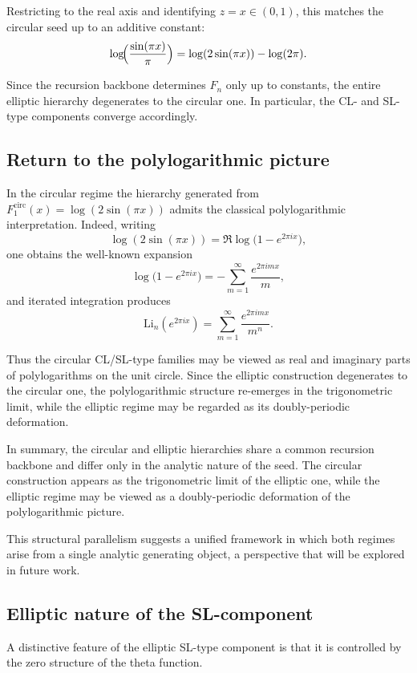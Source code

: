 \documentclass[11pt]{article}
\begin{document}
Restricting to the real axis and identifying $z=x\in(0,1)$,
this matches the circular seed up to an additive constant:
\[
\log\!\Bigl(\frac{\sin(\pi x)}{\pi}\Bigr)
=
\log(2\sin(\pi x))-\log(2\pi).
\]

Since the recursion backbone determines $F_n$ only up to constants,
the entire elliptic hierarchy degenerates to the circular one.
In particular, the CL- and SL-type components converge accordingly.


\subsection{Return to the polylogarithmic picture}

In the circular regime the hierarchy generated from
\(
F^{\mathrm{circ}}_1(x)=\log(2\sin(\pi x))
\)
admits the classical polylogarithmic interpretation.
Indeed, writing
\[
\log(2\sin(\pi x))
=
\Re \log\!\bigl(1-e^{2\pi i x}\bigr),
\]
one obtains the well-known expansion
\[
\log\!\bigl(1-e^{2\pi i x}\bigr)
=
-\sum_{m=1}^{\infty}\frac{e^{2\pi i m x}}{m},
\]
and iterated integration produces~\cite{ZagierPolylog}
\[
\mathrm{Li}_n(e^{2\pi i x})
=
\sum_{m=1}^{\infty}\frac{e^{2\pi i m x}}{m^n}.
\]

Thus the circular CL/SL-type families may be viewed as real and imaginary
parts of polylogarithms on the unit circle.
Since the elliptic construction degenerates to the circular one,
the polylogarithmic structure re-emerges in the trigonometric limit,
while the elliptic regime may be regarded as its doubly-periodic deformation.

\medskip

In summary, the circular and elliptic hierarchies share a common
recursion backbone and differ only in the analytic nature of the seed.
The circular construction appears as the trigonometric limit of the
elliptic one, while the elliptic regime may be viewed as a
doubly-periodic deformation of the polylogarithmic picture.

\medskip

This structural parallelism suggests a unified framework in which both regimes arise from a single analytic generating object, a perspective that will be explored in future work.


\subsection{Elliptic nature of the SL-component}

A distinctive feature of the elliptic SL-type component is that it is
controlled by the zero structure of the theta function.
\end{document}
